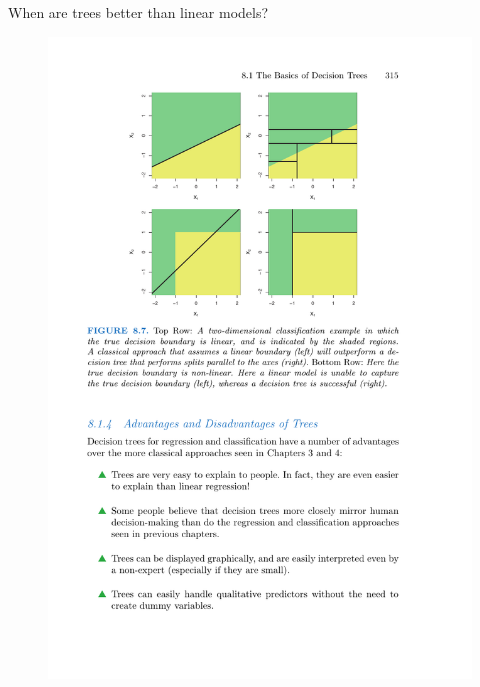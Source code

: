 \documentclass[mathserif, aspectratio=169]{beamer}
\begin{document}
\begin{frame}{When are trees better than linear models?}
\begin{figure}
\includegraphics[height=0.9\textheight]{tree_vs_linear_for_classification}
\caption*{}
\end{figure}
\end{frame}
\end{document}

